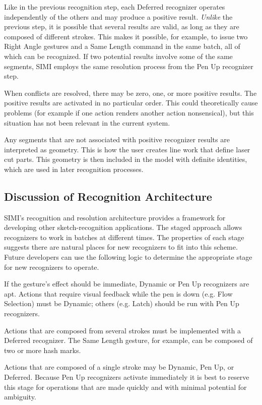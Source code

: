 Like in the previous recognition step, each Deferred recognizer
operates independently of the others and may produce a positive
result. \textit{Unlike} the previous step, it is possible that several
results are valid, as long as they are composed of different
strokes. This makes it possible, for example, to issue two Right Angle
gestures and a Same Length command in the same batch, all of which can
be recognized. If two potential results involve some of the same
segments, SIMI employs the same resolution process from the Pen Up
recognizer step.

When conflicts are resolved, there may be zero, one, or more positive
results. The positive results are activated in no particular
order. This could theoretically cause problems (for example if one
action renders another action nonsensical), but this situation has not
been relevant in the current system.

Any segments that are not associated with positive recognizer results
are interpreted as geometry. This is how the user creates line work
that define laser cut parts. This geometry is then included in the
model with definite identities, which are used in later recognition
processes.

\subsection{Discussion of Recognition Architecture}

SIMI's recognition and resolution architecture provides a framework
for developing other sketch-recognition applications. The staged
approach allows recognizers to work in batches at different times. The
properties of each stage suggests there are natural places for new
recognizers to fit into this scheme. Future developers can use the
following logic to determine the appropriate stage for new recognizers
to operate.

If the gesture's effect should be immediate, Dynamic or Pen Up
recognizers are apt. Actions that require visual feedback while the
pen is down (e.g. Flow Selection) must be Dynamic; others (e.g. Latch)
should be run with Pen Up recognizers.

Actions that are composed from several strokes must be implemented
with a Deferred recognizer. The Same Length gesture, for example, can
be composed of two or more hash marks.

Actions that are composed of a single stroke may be Dynamic, Pen Up,
or Deferred. Because Pen Up recognizers activate immediately it is
best to reserve this stage for operations that are made quickly and
with minimal potential for ambiguity. 

